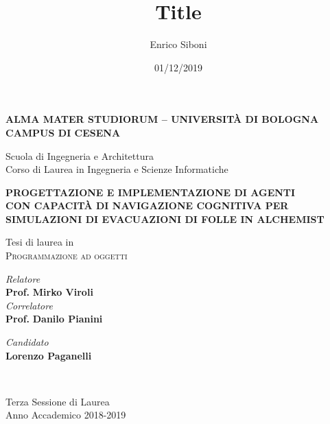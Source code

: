 \title{Title}
\author{Enrico Siboni}
\date{01/12/2019}

\begin{titlepage}
	\begin{center}
		
		\large
		\textbf{ALMA MATER STUDIORUM -- UNIVERSITÀ DI BOLOGNA \\ CAMPUS DI CESENA}
		\\
		\noindent\hrulefill
		\vspace{0.4cm}
		
		\Large
		Scuola di Ingegneria e Architettura \\
		Corso di Laurea in Ingegneria e Scienze Informatiche
		
		\vspace{4cm}
		\begin{center}
        {\large{\bf PROGETTAZIONE E IMPLEMENTAZIONE DI AGENTI}}\\
        \vspace{2mm}
        {\large{\bf CON CAPACITÀ DI NAVIGAZIONE COGNITIVA PER}}\\
        \vspace{2mm}
        {\large{\bf SIMULAZIONI DI EVACUAZIONI DI FOLLE IN ALCHEMIST}}\\
        \end{center}
		
		\large
		\vspace{1cm}
		Tesi di laurea in 
		\\
		\textsc{Programmazione ad oggetti}
		
		\vspace{5.5cm}
		\begin{minipage}[t]{0.64\textwidth}
			\begin{flushleft}
				\textit{Relatore} 
				\\ 
				\textbf{Prof.} \textbf{Mirko Viroli}
				\\
				\vspace{0.4cm}
				\textit{Correlatore} 
				\\
				\textbf{Prof.} \textbf{Danilo Pianini}
			\end{flushleft}
		\end{minipage}
		\begin{minipage}[t]{0.34\textwidth}
			\begin{flushright}
				\textit{Candidato} 
				\\ 
				\textbf{Lorenzo Paganelli}
			\end{flushright}
		\end{minipage}\\
		
		\vfill
		\noindent\hrulefill
		\vspace{0.3cm}
		\Large
		
		Terza Sessione di Laurea
		\\
		Anno Accademico 2018-2019
	\end{center}
\end{titlepage}
\restoregeometry
